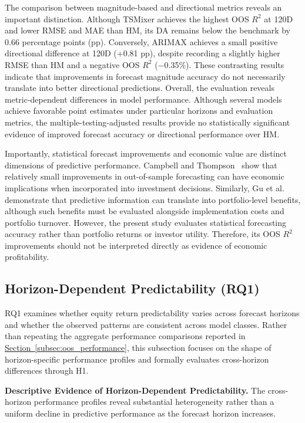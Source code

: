 \documentclass[runningheads,orivec]{llncs}
\begin{document}
The comparison between magnitude-based and directional metrics reveals an important distinction. Although TSMixer achieves the highest OOS $R^2$ at 120D and lower RMSE and MAE than HM, its DA remains below the benchmark by 0.66 percentage points (pp). Conversely, ARIMAX achieves a small positive directional difference at 120D (+0.81 pp), despite recording a slightly higher RMSE than HM and a negative OOS $R^2$ ($-$0.35\%). These contrasting results indicate that improvements in forecast magnitude accuracy do not necessarily translate into better directional predictions. Overall, the evaluation reveals metric-dependent differences in model performance. Although several models achieve favorable point estimates under particular horizons and evaluation metrics, the multiple-testing-adjusted results provide no statistically significant evidence of improved forecast accuracy or directional performance over HM.

Importantly, statistical forecast improvements and economic value are distinct dimensions of predictive performance. Campbell and Thompson~\cite{campbell2008} show that relatively small improvements in out-of-sample forecasting can have economic implications when incorporated into investment decisions. Similarly, Gu et al.~\cite{gu2020} demonstrate that predictive information can translate into portfolio-level benefits, although such benefits must be evaluated alongside implementation costs and portfolio turnover. However, the present study evaluates statistical forecasting accuracy rather than portfolio returns or investor utility. Therefore, its OOS $R^2$ improvements should not be interpreted directly as evidence of economic profitability.

\subsection{Horizon-Dependent Predictability (RQ1)}

RQ1 examines whether equity return predictability varies across forecast horizons and whether the observed patterns are consistent across model classes. Rather than repeating the aggregate performance comparisons reported in \hyperref[subsec:oos_performance]{Section~\ref*{subsec:oos_performance}}, this subsection focuses on the shape of horizon-specific performance profiles and formally evaluates cross-horizon differences through H1.

\noindent\textbf{Descriptive Evidence of Horizon-Dependent Predictability.} The cross-horizon performance profiles reveal substantial heterogeneity rather than a uniform decline in predictive performance as the forecast horizon increases.
\end{document}
